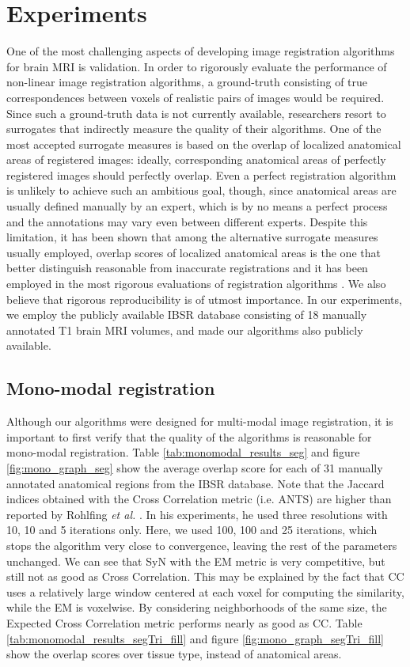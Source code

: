 \section{Experiments}
One of the most challenging aspects of developing image registration algorithms for brain MRI is validation. In order to rigorously evaluate the performance of non-linear
image registration algorithms, a ground-truth consisting of true correspondences between voxels of realistic pairs of images would be required. Since such a ground-truth data is
not currently available, researchers resort to surrogates that indirectly measure the quality of their algorithms. One of the most accepted surrogate measures is based
on the overlap of localized anatomical areas of registered images: ideally, corresponding anatomical areas of perfectly registered images should perfectly
overlap. Even a perfect registration algorithm is unlikely to achieve such an ambitious goal, though, since anatomical areas are usually defined manually by an expert, which is
by no means a perfect process and the annotations may vary even between different experts. Despite this limitation, it has been shown that among the alternative surrogate measures
usually employed, overlap scores of localized anatomical areas is the one that better distinguish reasonable from inaccurate registrations \cite{Rohlfing2012} and it has been employed
in the most rigorous evaluations of registration algorithms \cite{Klein2009}\cite{Klein2010}\cite{Rohlfing2012}. We also believe that rigorous reproducibility is of utmost importance. In our
experiments, we employ the publicly available IBSR database consisting of 18 manually annotated T1 brain MRI volumes, and made our algorithms also publicly available.

\subsection{Mono-modal registration}
Although our algorithms were designed for multi-modal image registration, it is important to first verify that the quality of the algorithms is reasonable for mono-modal registration.
Table \ref{tab:monomodal_results_seg} and figure \ref{fig:mono_graph_seg} show the average overlap score for each of 31 manually annotated anatomical regions from the IBSR database.
Note that the Jaccard indices obtained with the Cross Correlation metric (i.e. ANTS) are higher than reported by Rohlfing {\it et al.} \cite{Rohlfing2012}. In his experiments, he used
three resolutions with 10, 10 and 5 iterations only. Here, we used 100, 100 and 25 iterations, which stops the algorithm very close to convergence, leaving the rest of the parameters
unchanged. We can see that SyN with the EM metric is very competitive, but still not as good as Cross Correlation. This may be explained by the fact that CC uses a relatively large
window centered at each voxel for computing the similarity, while the EM is voxelwise. By considering neighborhoods of the same size, the Expected Cross Correlation metric performs
nearly as good as CC. Table \ref{tab:monomodal_results_segTri_fill} and figure \ref{fig:mono_graph_segTri_fill} show the overlap scores over tissue type, instead of anatomical areas.

